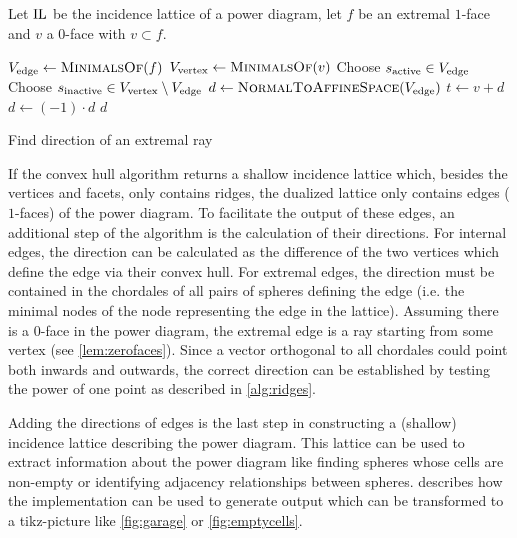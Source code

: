 \begin{algorithm}[tbp]
    Let $\operatorname{IL}$ be the incidence lattice of a power diagram, let $f$ be an extremal $1$-face and $v$ a $0$-face with $v \subset f$.
    \begin{algorithmic}[1]
        \State $V_{\textnormal{edge}} \gets \Call{MinimalsOf}{f}$
            \State $V_{\textnormal{vertex}} \gets \Call{MinimalsOf}{v}$
            \State Choose $s_{\textnormal{active}} \in V_{\textnormal{edge}}$
            \State Choose $s_{\textnormal{inactive}} \in V_{\textnormal{vertex}} \setminus V_{\textnormal{edge}}$
            \Statex
            \State $d \gets \Call{NormalToAffineSpace}{V_{\textnormal{edge}}}$
            \State $t \gets v + d$
                \State $d \gets (-1) \cdot d$
            \EndIf
            \State \Return $d$
        \EndFunction
    \end{algorithmic}
    \caption{Find direction of an extremal ray}
    \label{alg:ridges}
\end{algorithm}
If the convex hull algorithm returns a shallow incidence lattice which, besides the vertices and facets, only contains ridges, the dualized lattice only contains edges ($1$-faces) of the power diagram.
To facilitate the output of these edges, an additional step of the algorithm is the calculation of their directions.
For internal edges, the direction can be calculated as the difference of the two vertices which define the edge via their convex hull.
For extremal edges, the direction must be contained in the chordales of all pairs of spheres defining the edge (i.e. the minimal nodes of the node representing the edge in the lattice).
Assuming there is a $0$-face in the power diagram, the extremal edge is a ray starting from some vertex (see \cref{lem:zerofaces}).
Since a vector orthogonal to all chordales could point both inwards and outwards, the correct direction can be established by testing the power of one point as described in \cref{alg:ridges}.

Adding the directions of edges is the last step in constructing a (shallow) incidence lattice describing the power diagram.
This lattice can be used to extract information about the power diagram like finding spheres whose cells are non-empty or identifying adjacency relationships between spheres.
 describes how the implementation can be used to generate output which can be transformed to a tikz-picture like \cref{fig:garage} or \cref{fig:emptycells}.

